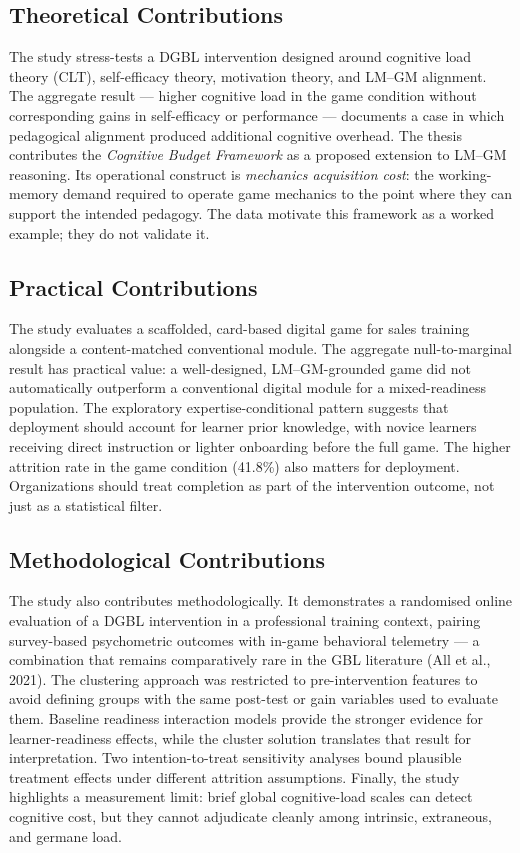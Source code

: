 \documentclass[12pt]{report}
\begin{document}
\subsection{Theoretical Contributions}
The study stress-tests a DGBL intervention designed around cognitive load theory (CLT), self-efficacy theory, motivation theory, and LM--GM alignment. The aggregate result --- higher cognitive load in the game condition without corresponding gains in self-efficacy or performance --- documents a case in which pedagogical alignment produced additional cognitive overhead. The thesis contributes the \textit{Cognitive Budget Framework} as a proposed extension to LM--GM reasoning. Its operational construct is \textit{mechanics acquisition cost}: the working-memory demand required to operate game mechanics to the point where they can support the intended pedagogy. The data motivate this framework as a worked example; they do not validate it.

\subsection{Practical Contributions}
The study evaluates a scaffolded, card-based digital game for sales training alongside a content-matched conventional module. The aggregate null-to-marginal result has practical value: a well-designed, LM--GM-grounded game did not automatically outperform a conventional digital module for a mixed-readiness population. The exploratory expertise-conditional pattern suggests that deployment should account for learner prior knowledge, with novice learners receiving direct instruction or lighter onboarding before the full game. The higher attrition rate in the game condition (41.8\%) also matters for deployment. Organizations should treat completion as part of the intervention outcome, not just as a statistical filter.

\subsection{Methodological Contributions}
The study also contributes methodologically. It demonstrates a randomised online evaluation of a DGBL intervention in a professional training context, pairing survey-based psychometric outcomes with in-game behavioral telemetry --- a combination that remains comparatively rare in the GBL literature (All et al., 2021). The clustering approach was restricted to pre-intervention features to avoid defining groups with the same post-test or gain variables used to evaluate them. Baseline readiness interaction models provide the stronger evidence for learner-readiness effects, while the cluster solution translates that result for interpretation. Two intention-to-treat sensitivity analyses bound plausible treatment effects under different attrition assumptions. Finally, the study highlights a measurement limit: brief global cognitive-load scales can detect cognitive cost, but they cannot adjudicate cleanly among intrinsic, extraneous, and germane load.
\end{document}
